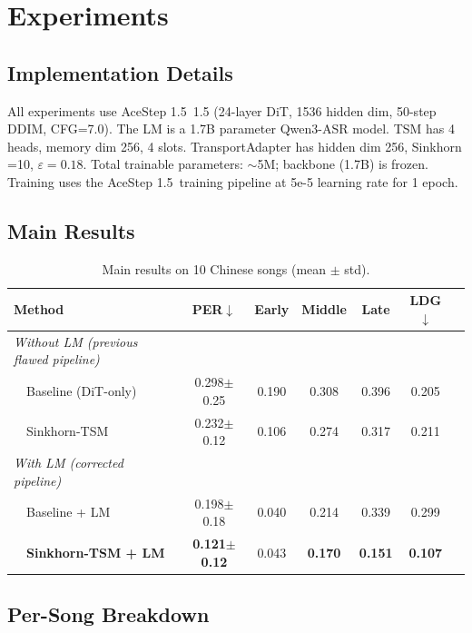 \documentclass[11pt,a4paper]{article}
\newcommand{\dit}{AceStep 1.5}
\newcommand{\per}{PER}
\begin{document}
\section{Experiments}
\label{sec:exp}

\subsection{Implementation Details}

All experiments use \dit~1.5 (24-layer DiT, 1536 hidden dim, 50-step DDIM, CFG=7.0). The LM is a 1.7B parameter Qwen3-ASR model. TSM has 4 heads, memory dim 256, 4 slots. TransportAdapter has hidden dim 256, Sinkhorn =10, $\varepsilon=0.18$. Total trainable parameters: $\sim$5M; backbone (1.7B) is frozen. Training uses the \dit~training pipeline at 5e-5 learning rate for 1 epoch.

\subsection{Main Results}

\begin{table}[h]
\centering
\caption{Main results on 10 Chinese songs (mean $\pm$ std).}
\label{tab:main}
\begin{tabular}{lcccccc}
\toprule
Method & \per$\downarrow$ & Early & Middle & Late & \textsc{LDG}$\downarrow$ \\
\midrule
\textit{Without LM (previous flawed pipeline)} \\
~~Baseline (DiT-only) & 0.298$\pm$0.25 & 0.190 & 0.308 & 0.396 & 0.205 \\
~~Sinkhorn-TSM & 0.232$\pm$0.12 & 0.106 & 0.274 & 0.317 & 0.211 \\
\midrule
\textit{With LM (corrected pipeline)} \\
~~Baseline + LM & 0.198$\pm$0.18 & 0.040 & 0.214 & 0.339 & 0.299 \\
~~\textbf{Sinkhorn-TSM + LM} & \textbf{0.121$\pm$0.12} & 0.043 & \textbf{0.170} & \textbf{0.151} & \textbf{0.107} \\
\bottomrule
\end{tabular}
\end{table}

\subsection{Per-Song Breakdown}
\end{document}
